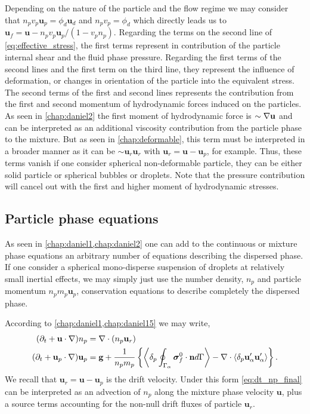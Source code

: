 Depending on the nature of the particle and the flow regime we may consider that $n_pv_p\textbf{u}_p = \phi_d \textbf{u}_d$ and $n_pv_p = \phi_d$ which directly leads us to $\textbf{u}_f = \textbf{u}- n_pv_p \textbf{u}_p / (1 - v_pn_p)$. 
Regarding the terms on the second line of \ref{eq:effective_stress}, the first terms represent in contribution of the particle internal shear and the fluid phase pressure.
Regarding the first terms of the second lines and the first term on the third line, they represent the influence of deformation, or changes in orientation of the particle into the equivalent stress. 
The second terms of the first and second lines represents the contribution from the first and second momentum of hydrodynamic forces induced on the particles. 
As seen in \ref{chap:daniel2} the first moment of hydrodynamic force is $\sim \mathbf{\nabla} \textbf{u}$ and can be interpreted as an additional viscosity contribution from the particle phase to the mixture. 
But as seen in \ref{chap:deformable}, this term must be interpreted in a broader manner as it can be $\sim \textbf{u}_r \textbf{u}_r$ with $\textbf{u}_r = \textbf{u}- \textbf{u}_p$, for example.
Thus, these terms vanish if one consider spherical non-deformable particle, they can be either solid particle or spherical bubbles or droplets. 
Note that the pressure contribution will cancel out with the first and higher moment of hydrodynamic stresses. 


\subsection{Particle phase equations}

As seen in \ref{chap:daniel1,chap:daniel2} one can add to the continuous or mixture phase equations an arbitrary number of equations describing the dispersed phase. 
If one consider a spherical mono-disperse suspension of droplets at relatively small inertial effects, we may simply just use the number density, $n_p$ and particle momentum $n_pm_p \textbf{u}_p$, conservation equations to describe completely the dispersed phase. 

According to \ref{chap:daniel1,chap:daniel15} we may write, 
\begin{align}
    (\pddt  
    + \textbf{u} \cdot\grad )n_p
    &= 
    \div (n_p\textbf{u}_r)
    \label{eq:dt_np_final}
    \\
    (\pddt + \textbf{u}_p \cdot \grad)  \textbf{u}_p
    &= 
    \textbf{g}
    + \frac{1}{n_pm_p}\left\{
        \pSavg{\bm\sigma_f^0 \cdot \textbf{n}}
        - \div \pavg{\textbf{u}_\alpha'\textbf{u}_\alpha'}
    \right\}.
    \label{eq:dt_up_final}
\end{align}
We recall that $\textbf{u}_r = \textbf{u} - \textbf{u}_p$ is the drift velocity. 
Under this form \ref{eq:dt_np_final} can be interpreted as an advection of $n_p$ along the mixture phase velocity $\textbf{u}$, plus a source terms accounting for the non-null drift fluxes of particle $\textbf{u}_r$. 


